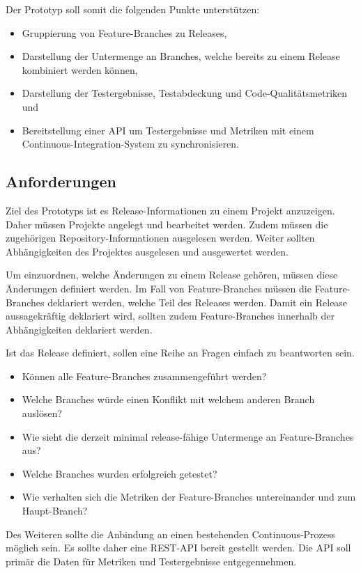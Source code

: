 Der Prototyp soll somit die folgenden Punkte unterstützen:
\begin{itemize}
\item Gruppierung von Feature-Branches zu Releases,
\item Darstellung der Untermenge an Branches, welche bereits zu einem Release kombiniert werden können,
\item Darstellung der Testergebnisse, Testabdeckung und Code-Qualitätsmetriken und
\item Bereitstellung einer API um Testergebnisse und Metriken mit einem Continuous-Integration-System zu synchronisieren.
\end{itemize}

\subsection{Anforderungen}

Ziel des Prototyps ist es Release-Informationen zu einem Projekt anzuzeigen. Daher müssen Projekte angelegt und bearbeitet werden. Zudem müssen die zugehörigen Repository-Informationen ausgelesen werden. Weiter sollten Abhängigkeiten des Projektes ausgelesen und ausgewertet werden. 

Um einzuordnen, welche Änderungen zu einem Release gehören, müssen diese Änderungen definiert werden. Im Fall von Feature-Branches müssen die Feature-Branches deklariert werden, welche Teil des Releases werden. Damit ein Release aussagekräftig deklariert wird, sollten zudem Feature-Branches innerhalb der Abhängigkeiten deklariert werden.

Ist das Release definiert, sollen eine Reihe an Fragen einfach zu beantworten sein. 
\begin{itemize}
\item Können alle Feature-Branches zusammengeführt werden?
\item Welche Branches würde einen Konflikt mit welchem anderen Branch auslösen?
\item Wie sieht die derzeit minimal release-fähige Untermenge an Feature-Branches aus?
\item Welche Branches wurden erfolgreich getestet?
\item Wie verhalten sich die Metriken der Feature-Branches untereinander und zum Haupt-Branch?
\end{itemize}

Des Weiteren sollte die Anbindung an einen bestehenden Continuous-Prozess möglich sein. Es sollte daher eine REST-API bereit gestellt werden. Die API soll primär die Daten für Metriken und Testergebnisse entgegennehmen.

